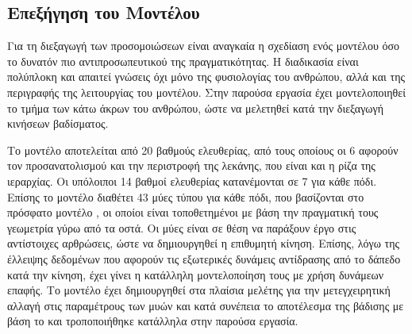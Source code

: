 %

\subsection{Επεξήγηση του Μοντέλου}

Για τη διεξαγωγή των προσομοιώσεων είναι αναγκαία η σχεδίαση ενός μοντέλου όσο το δυνατόν πιο αντιπροσωπευτικού της πραγματικότητας. Η διαδικασία είναι πολύπλοκη και απαιτεί γνώσεις όχι μόνο της φυσιολογίας του ανθρώπου, αλλά και της περιγραφής της λειτουργίας του μοντέλου. Στην παρούσα εργασία έχει μοντελοποιηθεί το τμήμα των κάτω άκρων του ανθρώπου, ώστε να μελετηθεί κατά την διεξαγωγή κινήσεων βαδίσματος.

Το μοντέλο αποτελείται από 20 βαθμούς ελευθερίας, από τους οποίους οι 6 αφορούν τον προσανατολισμού και την περιστροφή της λεκάνης, που είναι και η ρίζα της ιεραρχίας. Οι υπόλοιποι 14 βαθμοί ελευθερίας κατανέμονται σε 7 για κάθε πόδι. Επίσης το μοντέλο διαθέτει 43 μύες τύπου  για κάθε πόδι, που βασίζονται στο πρόσφατο μοντέλο \cite{millard13}, οι οποίοι είναι τοποθετημένοι με βάση την πραγματική τους γεωμετρία γύρω από τα οστά. Οι μύες είναι σε θέση να παράξουν έργο στις αντίστοιχες αρθρώσεις, ώστε να δημιουργηθεί η επιθυμητή κίνηση. Επίσης, λόγω της έλλειψης δεδομένων που αφορούν τις εξωτερικές δυνάμεις αντίδρασης από το δάπεδο κατά την κίνηση, έχει γίνει η κατάλληλη μοντελοποίηση τους με χρήση δυνάμεων επαφής. Το μοντέλο έχει δημιουργηθεί στα πλαίσια μελέτης για την μετεγχειρητική αλλαγή στις παραμέτρους των μυών και κατά συνέπεια το αποτέλεσμα της βάδισης με βάση το \cite{delp90} και τροποποιήθηκε κατάλληλα στην παρούσα εργασία.


